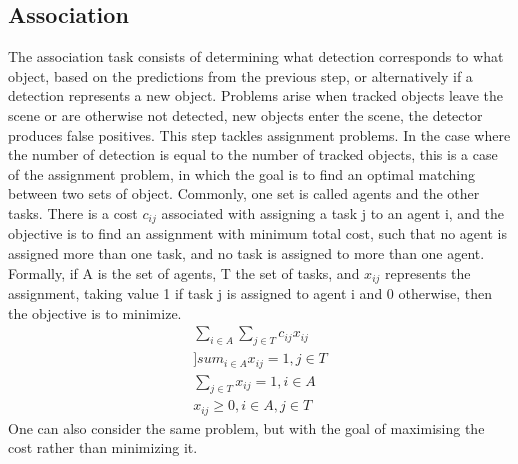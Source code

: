     \subsection{Association}
        The association task consists of determining what detection corresponds to what object, based on the predictions from the previous step, or alternatively if a detection represents a new object. Problems arise when tracked objects leave the scene or are 
        otherwise not detected, new objects enter the scene, the detector produces false positives. This step tackles assignment problems. In the case where the number of detection is equal to the number of tracked objects, this is a case of the assignment problem, 
        in which the goal is to find an optimal matching between two sets of object. Commonly, one set is called agents and the other tasks. There is a cost $c_{ij}$ associated with assigning a task j to an agent i, and the objective is to find an assignment with 
        minimum total cost, such that no agent is assigned more than one task, and no task is assigned to more than one agent. Formally, if A is the set of agents, T the set of tasks, and $x_{ij}$ represents the assignment, taking value 1 if task j is assigned to agent 
        i and 0 otherwise, then the objective is to minimize.
        \begin{align}
            \displaystyle\sum_{i \in A} \displaystyle\sum_{j \in T} c_{ij} x_{ij} \\ 
            \displaystyle]sum_{i \in A} x_{ij} = 1, j \in T \\ 
            \displaystyle\sum_{j \in T} x_{ij} = 1, i \in A \\ 
            x_{ij} \geq 0, i \in A, j \in T
        \end{align}
        One can also consider the same problem, but with the goal of maximising the cost rather
        than minimizing it.
